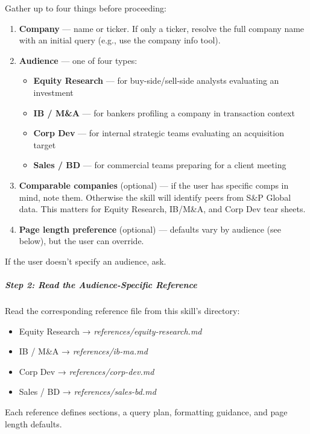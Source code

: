 \documentclass[11pt]{article}
\begin{document}
Gather up to four things before proceeding:


\begin{enumerate}[leftmargin=*,itemsep=2pt,topsep=2pt]
\item {} \textbf{Company} — name or ticker. If only a ticker, resolve the full company name with an initial query (e.g., use the company info tool).
\item {} \textbf{Audience} — one of four types:
\begin{itemize}[leftmargin=*,itemsep=2pt,topsep=2pt]
\item {} \textbf{Equity Research} — for buy-side/sell-side analysts evaluating an investment
\item {} \textbf{IB / M\&A} — for bankers profiling a company in transaction context
\item {} \textbf{Corp Dev} — for internal strategic teams evaluating an acquisition target
\item {} \textbf{Sales / BD} — for commercial teams preparing for a client meeting
\end{itemize}
\item {} \textbf{Comparable companies} (optional) — if the user has specific comps in mind, note them. Otherwise the skill will identify peers from S\&P Global data. This matters for Equity Research, IB/M\&A, and Corp Dev tear sheets.
\item {} \textbf{Page length preference} (optional) — defaults vary by audience (see below), but the user can override.
\end{enumerate}

If the user doesn't specify an audience, ask.


\subparagraph{Step 2: Read the Audience-Specific Reference}\mbox{}\par

Read the corresponding reference file from this skill's directory:


\begin{itemize}[leftmargin=*,itemsep=2pt,topsep=2pt]
\item {} Equity Research → \emph{references/equity-research.md}
\item {} IB / M\&A → \emph{references/ib-ma.md}
\item {} Corp Dev → \emph{references/corp-dev.md}
\item {} Sales / BD → \emph{references/sales-bd.md}
\end{itemize}

Each reference defines sections, a query plan, formatting guidance, and page length defaults.
\end{document}
